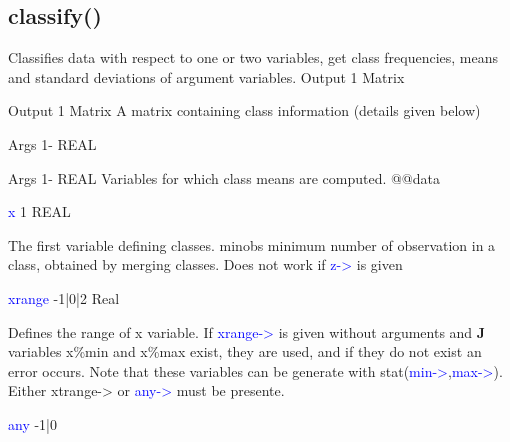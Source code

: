 \subsection{\textcolor{VioletRed}{classify}()}
\label{classify}
Classifies data with respect to one or two variables, get class
frequencies,
means and standard deviations of
argument variables.
\vspace{0.3cm}
\hline
\vspace{0.3cm}
\noindent Output \tabto{3cm}  1 \tabto{5cm}  Matrix \tabto{7cm}
\begin{changemargin}{3cm}{0cm}
\noindent \noindent Output \tabto{3cm}  1 \tabto{5cm}  Matrix \tabto{7cm}
A matrix containing class information (details given below)
\end{changemargin}
\vspace{0.3cm}
\hline
\vspace{0.3cm}
\noindent Args \tabto{3cm} 1- \tabto{5cm}  REAL \tabto{7cm}
\begin{changemargin}{3cm}{0cm}
\noindent \noindent Args \tabto{3cm} 1- \tabto{5cm}  REAL \tabto{7cm}
Variables for which class means are computed.
@@data
\end{changemargin}
\vspace{0.3cm}
\hline
\vspace{0.3cm}
\noindent \textcolor{blue}{x}  \tabto{3cm} 1 \tabto{5cm}  REAL \tabto{7cm}
\begin{changemargin}{3cm}{0cm}
\noindent The first variable defining classes.
minobs minimum number of observation in a class, obtained by merging classes. Does
not work if \textcolor{blue}{z->} is given
\end{changemargin}
\vspace{0.3cm}
\hline
\vspace{0.3cm}
\noindent \textcolor{blue}{xrange} \tabto{3cm}  -1|0|2 \tabto{5cm}  Real \tabto{7cm}
\begin{changemargin}{3cm}{0cm}
\noindent  Defines the range of x variable. If \textcolor{blue}{xrange->} is given without
arguments and \textbf{J} variables x\%min and x\%max exist, they are used, and
if they do not exist an error occurs. Note that these variables can be
generate with \textcolor{VioletRed}{stat}(\textcolor{blue}{min->},\textcolor{blue}{max->}). Either xtrange-> or \textcolor{blue}{any->} must be presente.
\end{changemargin}
\vspace{0.3cm}
\hline
\vspace{0.3cm}
\noindent \textcolor{blue}{any} \tabto{3cm} -1|0 \tabto{5cm}    \tabto{7cm}
